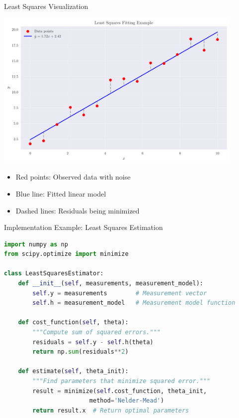 \documentclass[aspectratio=169]{beamer}
\begin{document}
\begin{frame}{Least Squares Visualization}
    \begin{center}
        \includegraphics[width=0.9\textwidth]{least_squares.pdf}
    \end{center}
    \begin{itemize}
        \item Red points: Observed data with noise
        \item Blue line: Fitted linear model
        \item Dashed lines: Residuals being minimized
    \end{itemize}
\end{frame}

\begin{frame}[fragile]{Implementation Example: Least Squares Estimation}
\begin{lstlisting}[language=Python]
import numpy as np
from scipy.optimize import minimize

class LeastSquaresEstimator:
    def __init__(self, measurements, measurement_model):
        self.y = measurements        # Measurement vector
        self.h = measurement_model   # Measurement model function
        
    def cost_function(self, theta):
        """Compute sum of squared errors."""
        residuals = self.y - self.h(theta)
        return np.sum(residuals**2)
    
    def estimate(self, theta_init):
        """Find parameters that minimize squared error."""
        result = minimize(self.cost_function, theta_init, 
                        method='Nelder-Mead')
        return result.x  # Return optimal parameters
\end{lstlisting}
\end{frame}
\end{document}
